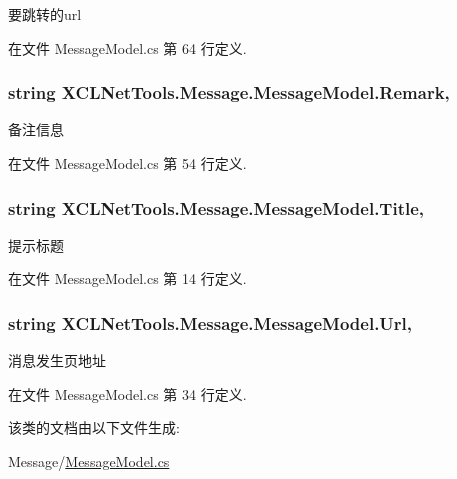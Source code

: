 要跳转的url 



在文件 Message\-Model.\-cs 第 64 行定义.

\hypertarget{class_x_c_l_net_tools_1_1_message_1_1_message_model_a9cbdcd7db26f62ea746c835e82e3dcf0}{
\subsubsection[{Remark}]{\setlength{\rightskip}{0pt plus 5cm}string X\-C\-L\-Net\-Tools.\-Message.\-Message\-Model.\-Remark\hspace{0.3cm}{\ttfamily [get]}, {\ttfamily [set]}}}\label{class_x_c_l_net_tools_1_1_message_1_1_message_model_a9cbdcd7db26f62ea746c835e82e3dcf0}


备注信息 



在文件 Message\-Model.\-cs 第 54 行定义.

\hypertarget{class_x_c_l_net_tools_1_1_message_1_1_message_model_a580b7fe7f6918b6803a7e7b8e656905b}{
\subsubsection[{Title}]{\setlength{\rightskip}{0pt plus 5cm}string X\-C\-L\-Net\-Tools.\-Message.\-Message\-Model.\-Title\hspace{0.3cm}{\ttfamily [get]}, {\ttfamily [set]}}}\label{class_x_c_l_net_tools_1_1_message_1_1_message_model_a580b7fe7f6918b6803a7e7b8e656905b}


提示标题 



在文件 Message\-Model.\-cs 第 14 行定义.

\hypertarget{class_x_c_l_net_tools_1_1_message_1_1_message_model_a50c6a9523a8b8dc168360318f7be8574}{
\subsubsection[{Url}]{\setlength{\rightskip}{0pt plus 5cm}string X\-C\-L\-Net\-Tools.\-Message.\-Message\-Model.\-Url\hspace{0.3cm}{\ttfamily [get]}, {\ttfamily [set]}}}\label{class_x_c_l_net_tools_1_1_message_1_1_message_model_a50c6a9523a8b8dc168360318f7be8574}


消息发生页地址 



在文件 Message\-Model.\-cs 第 34 行定义.



该类的文档由以下文件生成\-:\begin{DoxyCompactItemize}
\item 
Message/\hyperlink{_message_model_8cs}{Message\-Model.\-cs}\end{DoxyCompactItemize}
